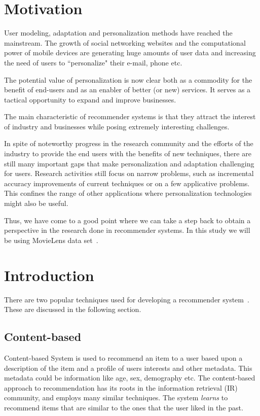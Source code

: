 \section{Motivation}

 User modeling, adaptation and personalization methods have reached the mainstream. The growth of social networking websites and the computational power of mobile devices are generating huge amounts of user data and increasing the need of users to ``personalize" their e-mail, phone etc.

 The potential value of personalization is now clear both as a commodity for the benefit of end-users and as an enabler of better (or new) services. It serves as a tactical opportunity to expand and improve businesses.

 The main characteristic of recommender systems is that they attract the interest of industry and businesses while posing extremely interesting challenges.

 In spite of noteworthy progress in the research community and the efforts of the industry to provide the end users with the benefits of new techniques, there are still many important gaps that make personalization and adaptation challenging for users. Research activities still focus on narrow problems, such as incremental accuracy improvements of current techniques or on a few applicative problems. This confines the range of other applications where personalization technologies might also be useful.

 Thus, we have come to a good point where we can take a step back to obtain a perspective in the research done in recommender systems. In this study we will be using MovieLens data set~\cite{movielens}.

\section{Introduction}
\label{sec:approaches}
There are two popular techniques used for developing a recommender system~\cite{nbrsurvey}. These are discussed in the following section.
\subsection{Content-based}
Content-based System is used to recommend an item to a user based upon a description of the item and a profile of users interests and other metadata. This metadata could be information like age, sex, demography etc. The content-based approach to recommendation has its roots in the information retrieval (IR) community, and employs many similar techniques. The system \textit{learns} to recommend items that are similar to the ones that the user liked in the past. 
